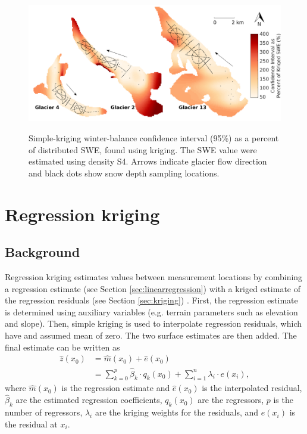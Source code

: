 \documentclass{sfuthesis}
\newcommand{\topomap}{Arrows indicate glacier flow direction and black dots show snow depth sampling locations. }
\begin{document}
\begin{figure}[H]
	\centering
	\includegraphics[width = \textwidth]{KrigingCI_percent.png}\\
	\caption{Simple-kriging winter-balance confidence interval (95\%) as a percent of distributed SWE, found using kriging. The SWE value were estimated using density S4. \topomap}
	\label{fig:krigingCI_percent}
\end{figure}

\section{Regression kriging}

\subsection{Background}

Regression kriging estimates values between measurement locations by combining a regression estimate (see Section \ref{sec:linearregression}) with a kriged estimate of the regression residuals (see Section \ref{sec:kriging}) \citep{Hengl2007}. First, the regression estimate is determined using auxiliary variables (e.g. terrain parameters such as elevation and slope). Then, simple kriging is used to interpolate regression residuals, which have and assumed mean of zero. The two surface estimates are then added. The final estimate can be written as 
\begin{align}
\hat{z}(x_0) &= \hat{m}(x_0) + \hat{e}(x_0)\\
& = \sum^p_{k=0}\hat{\beta}_k \cdot	q_k(x_0)+ \sum_{i=1}^{n} \lambda_i \cdot e(x_i),
\end{align}
where $\hat{m}(x_0)$ is the regression estimate and $\hat{e}(x_0)$ is the interpolated residual, $\hat{\beta}_k$ are the estimated regression coefficients, $q_k(x_0)$ are the regressors, $p$ is the number of regressors, $\lambda_i$ are the kriging weights for the residuals, and $e(x_i)$ is the residual at $x_i$.
\end{document}
